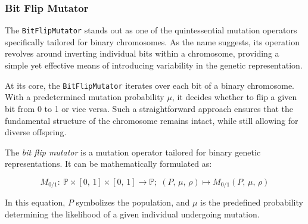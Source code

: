 
\subsubsection{Bit Flip Mutator}
\label{sec:keen:operators:mutation:bit_flip}

  The \texttt{BitFlipMutator} stands out as one of the quintessential mutation 
  operators specifically tailored for binary chromosomes. As the name suggests, 
  its operation revolves around inverting individual bits within a chromosome, 
  providing a simple yet effective means of introducing variability in the 
  genetic representation.

  At its core, the \texttt{BitFlipMutator} iterates over each bit of a binary 
  chromosome. With a predetermined mutation probability \( \mu \), it decides 
  whether to flip a given bit from 0 to 1 or vice versa. Such a straightforward 
  approach ensures that the fundamental structure of the chromosome remains 
  intact, while still allowing for diverse offspring.

  \begin{definition}
    The \emph{bit flip mutator} is a mutation operator tailored for binary genetic representations. It can be mathematically formulated as:

    \begin{equation}
      M_{0/1} :\: \mathbb{P} \times [0,\, 1] \times [0,\, 1] \to \mathbb{P};\;
      (P,\, \mu,\, \rho) \mapsto M_{0/1}(P,\, \mu,\, \rho)
    \end{equation}

    In this equation, \(P\) symbolizes the population, and \(\mu\) is the 
    predefined probability determining the likelihood of a given individual
    undergoing mutation.
  \end{definition}



